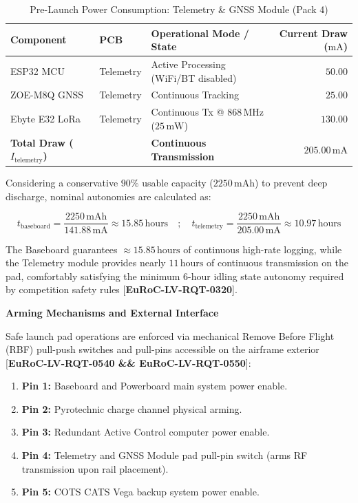 \documentclass[11pt, a4paper]{article} %
\newcommand{\req}[1]{[\textcolor{EtseNavy}{\textbf{#1}}]}
\begin{document}
\begin{table}[H]
\centering
\caption{Pre-Launch Power Consumption: Telemetry \& GNSS Module (Pack 4)}
\label{tab:power_consumption_telemetry}
\begin{tabularx}{\textwidth}{l l X r}
\toprule
\textbf{Component} & \textbf{PCB} & \textbf{Operational Mode / State} & \textbf{Current Draw ($\text{mA}$)} \\
\midrule
ESP32 MCU & Telemetry & Active Processing (WiFi/BT disabled) & $50.00$ \\
ZOE-M8Q GNSS & Telemetry & Continuous Tracking & $25.00$ \\
Ebyte E32 LoRa & Telemetry & Continuous Tx @ $868\,\text{MHz}$ ($25\,\text{mW}$) & $130.00$ \\
\midrule
\textbf{Total Draw ($I_{\text{telemetry}}$)} & & \textbf{Continuous Transmission} & \textbf{$205.00\,\text{mA}$} \\
\bottomrule
\end{tabularx}
\end{table}

Considering a conservative $90\%$ usable capacity ($2250\,\text{mAh}$) to prevent deep discharge, nominal autonomies are calculated as:

\begin{equation}
t_{\text{baseboard}} = \frac{2250\,\text{mAh}}{141.88\,\text{mA}} \approx 15.85\,\text{hours} \quad ; \quad t_{\text{telemetry}} = \frac{2250\,\text{mAh}}{205.00\,\text{mA}} \approx 10.97\,\text{hours}
\end{equation}

The Baseboard guarantees $\approx 15.85\,\text{hours}$ of continuous high-rate logging, while the Telemetry module provides nearly $11\,\text{hours}$ of continuous transmission on the pad, comfortably satisfying the minimum 6-hour idling state autonomy required by competition safety rules \req{EuRoC-LV-RQT-0320}.

\vspace{0.5em}
\noindent\textbf{Arming Mechanisms and External Interface}

Safe launch pad operations are enforced via mechanical Remove Before Flight (RBF) pull-push switches and pull-pins accessible on the airframe exterior \req{EuRoC-LV-RQT-0540 && EuRoC-LV-RQT-0550}:
\begin{enumerate}
    \item \textbf{Pin 1:} Baseboard and Powerboard main system power enable.
    \item \textbf{Pin 2:} Pyrotechnic charge channel physical arming.
    \item \textbf{Pin 3:} Redundant Active Control computer power enable.
    \item \textbf{Pin 4:} Telemetry and GNSS Module pad pull-pin switch (arms RF transmission upon rail placement).
    \item \textbf{Pin 5:} COTS CATS Vega backup system power enable.
\end{enumerate}
\end{document}
